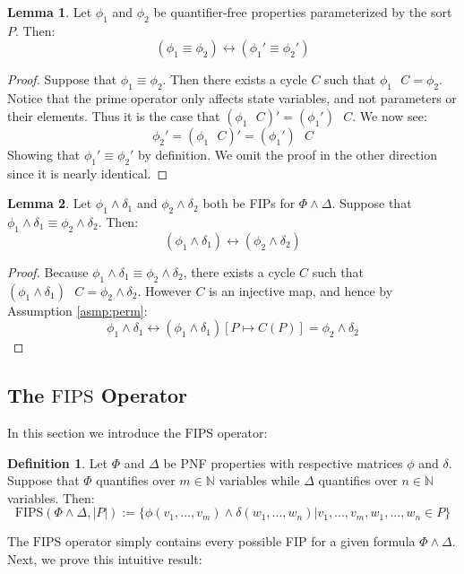 \documentclass[12pt]{article}
\theoremstyle{definition}
\newtheorem{lemma}{Lemma}
\newtheorem{definition}{Definition}
\theoremstyle{remark}
\newcommand{\msp}{\text{ }}
\newcommand{\fips}{\text{FIPS}}
\begin{document}
\begin{lemma}
  \label{lem:prime-bijec}
  Let $\phi_1$ and $\phi_2$ be quantifier-free properties parameterized by the sort $P$.  Then:
  $$(\phi_1 \equiv \phi_2) \leftrightarrow (\phi_1' \equiv \phi_2')$$
\end{lemma}
\begin{proof}
  Suppose that $\phi_1 \equiv \phi_2$.  Then there exists a cycle $C$ such that $\phi_1 \msp C = \phi_2$.  Notice that the prime operator only affects state variables, and not parameters or their elements.  Thus it is the case that $(\phi_1 \msp C)' = (\phi_1') \msp C$.  We now see:
  $$\phi_2' = (\phi_1 \msp C)' = (\phi_1') \msp C$$
  Showing that $\phi_1' \equiv \phi_2'$ by definition.  We omit the proof in the other direction since it is nearly identical.
\end{proof}

\begin{lemma}
  \label{lem:eqiv-bijec}
  Let $\phi_1\land\delta_1$ and $\phi_2\land\delta_2$ both be FIPs for $\Phi\land\Delta$.  Suppose that $\phi_1\land\delta_1 \equiv \phi_2\land\delta_2$.  Then:
  $$(\phi_1 \land \delta_1) \leftrightarrow (\phi_2 \land \delta_2)$$
\end{lemma}
\begin{proof}
  Because $\phi_1\land\delta_1 \equiv \phi_2\land\delta_2$, there exists a cycle $C$ such that $(\phi_1\land\delta_1) \msp C = \phi_2\land\delta_2$.  However $C$ is an injective map, and hence by Assumption \ref{asmp:perm}:
  $$\phi_1\land\delta_1 \leftrightarrow (\phi_1\land\delta_1)[P \mapsto C(P)] = \phi_2\land\delta_2$$
\end{proof}

\subsection{The $\fips$ Operator}

In this section we introduce the $\fips$ operator:
\begin{definition}
  Let $\Phi$ and $\Delta$ be PNF properties with respective matrices $\phi$ and $\delta$.  Suppose that $\Phi$ quantifies over $m \in \mathbb{N}$ variables while $\Delta$ quantifies over $n \in \mathbb{N}$ variables.  Then:
  $$\fips(\Phi \land \Delta, |P|) := \{\phi(v_1,...,v_m) \land \delta(w_1,...,w_n) | v_1,...,v_m,w_1,...,w_n \in P\}$$
\end{definition}

The $\fips$ operator simply contains every possible FIP for a given formula $\Phi \land \Delta$.  Next, we prove this intuitive result:
\end{document}
